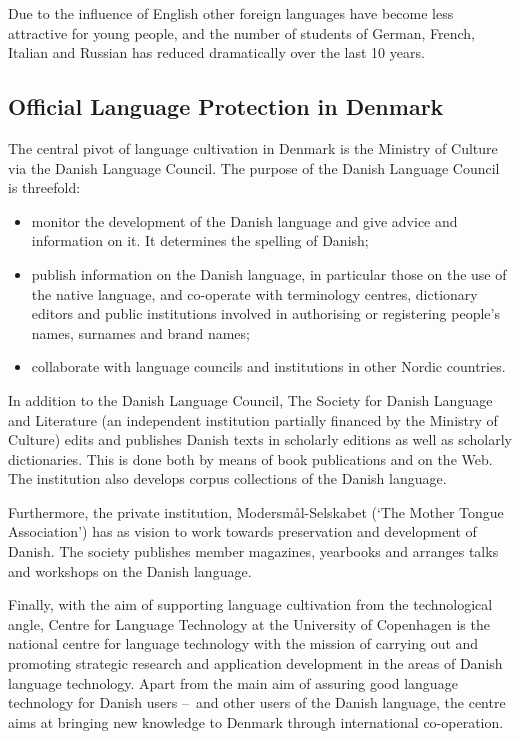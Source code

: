 \documentclass[]{../../metanetpaper}
\begin{document}
\begin{multicols}{2}
Due to the influence of English other foreign languages have become less attractive for young people, and the number of students of German, French, Italian and Russian has reduced dramatically over the last 10 years. 


\subsection{Official Language Protection in Denmark}

The central pivot of language cultivation in Denmark is the Ministry of Culture via the Danish Language Council. The purpose of the Danish Language Council is threefold: 
\begin{itemize}
\item	monitor the development of the Danish language and give advice and information on it. It determines the spelling of Danish;
\item	publish information on the Danish language, in particular those on the use of the native language, and co-operate with terminology centres, dictionary editors and public institutions involved in authorising or registering people's names,  surnames and brand names;
\item	collaborate with language councils and institutions in other Nordic countries.	
\end{itemize}
In addition to the Danish Language Council, The Society for Danish Language and Literature (an independent institution partially financed by the Ministry of Culture) edits and publishes Danish texts in scholarly editions as well as scholarly dictionaries. This is done both by means of book publications and on the Web. The institution also develops corpus collections of the Danish language.


Furthermore, the private institution, Moders\-m\aa l-Selskabet (`The Mother Tongue Association') has as vision to work towards preservation and development of Danish. The society publishes member magazines,  yearbooks and arranges talks and workshops on the Danish language.


Finally, with the aim of supporting language cultivation from the technological angle, Centre for Language Technology at the University of Copenhagen is the national centre for language technology with the mission of carrying out and promoting strategic research and application development in the areas of Danish language technology. Apart from the main aim of assuring good language technology for Danish users --~and other users of the Danish language, the centre aims at bringing new knowledge to Denmark through international co-operation.


\end{multicols}
\end{document}
